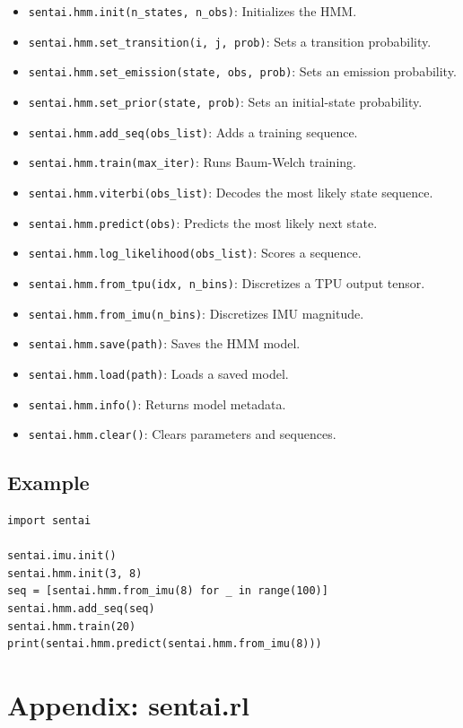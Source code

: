 \begin{itemize}
\tightlist
\item
  \texttt{sentai.hmm.init(n\_states,\ n\_obs)}: Initializes the HMM.
\item
  \texttt{sentai.hmm.set\_transition(i,\ j,\ prob)}: Sets a transition
  probability.
\item
  \texttt{sentai.hmm.set\_emission(state,\ obs,\ prob)}: Sets an
  emission probability.
\item
  \texttt{sentai.hmm.set\_prior(state,\ prob)}: Sets an initial-state
  probability.
\item
  \texttt{sentai.hmm.add\_seq(obs\_list)}: Adds a training sequence.
\item
  \texttt{sentai.hmm.train(max\_iter)}: Runs Baum-Welch training.
\item
  \texttt{sentai.hmm.viterbi(obs\_list)}: Decodes the most likely state
  sequence.
\item
  \texttt{sentai.hmm.predict(obs)}: Predicts the most likely next state.
\item
  \texttt{sentai.hmm.log\_likelihood(obs\_list)}: Scores a sequence.
\item
  \texttt{sentai.hmm.from\_tpu(idx,\ n\_bins)}: Discretizes a TPU output
  tensor.
\item
  \texttt{sentai.hmm.from\_imu(n\_bins)}: Discretizes IMU magnitude.
\item
  \texttt{sentai.hmm.save(path)}: Saves the HMM model.
\item
  \texttt{sentai.hmm.load(path)}: Loads a saved model.
\item
  \texttt{sentai.hmm.info()}: Returns model metadata.
\item
  \texttt{sentai.hmm.clear()}: Clears parameters and sequences.
\end{itemize}

\subsection{Example}\label{example-20}

\begin{verbatim}
import sentai

sentai.imu.init()
sentai.hmm.init(3, 8)
seq = [sentai.hmm.from_imu(8) for _ in range(100)]
sentai.hmm.add_seq(seq)
sentai.hmm.train(20)
print(sentai.hmm.predict(sentai.hmm.from_imu(8)))
\end{verbatim}

\section{Appendix: sentai.rl}\label{appendix-sentai.rl}

